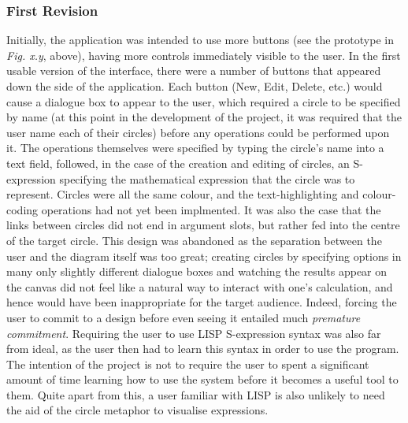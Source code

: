 \documentclass[12pt,twoside,notitlepage,xetex]{report}
\begin{document}
\subsubsection{First Revision}
Initially, the application was intended to use more buttons (see
the prototype in \emph{Fig. x.y}, above), having more controls immediately
visible to the user.  In the first usable version of the interface, there were
a number of buttons that appeared down the side of the application.  Each
button ({\sfapp New}, {\sfapp Edit}, {\sfapp Delete}, etc.) would cause a
dialogue box to appear to the user, which required a circle to be specified by
name (at this point in the development of the project, it was required that the
user name each of their circles) before any operations could be performed upon
it.  The operations themselves were specified by typing the circle's name into a text field, followed, in the case of the creation and editing of circles, an S-expression specifying the mathematical expression that the circle was to represent.  Circles were all the same colour, and the text-highlighting and colour-coding operations had not yet been implmented.  It was also the case that the links between circles did not end in argument slots, but rather fed into the centre of the target circle.  This design was abandoned as the separation between the user and the diagram itself was too great; creating circles by specifying options in many only slightly different dialogue boxes and watching the results appear on the canvas did not feel like a natural way to interact with one's calculation, and hence would have been inappropriate for the target audience.  Indeed, forcing the user to commit to a design before even seeing it entailed much \emph{premature commitment}.  Requiring the user to use LISP S-expression syntax was also far from ideal, as the user then had to learn this syntax in order to use the program.  The intention of the project is not to require the user to spent a significant amount of time learning how to use the system before it becomes a useful tool to them.  Quite apart from this, a user familiar with LISP is also unlikely to need the aid of the circle metaphor to visualise expressions.
\end{document}
